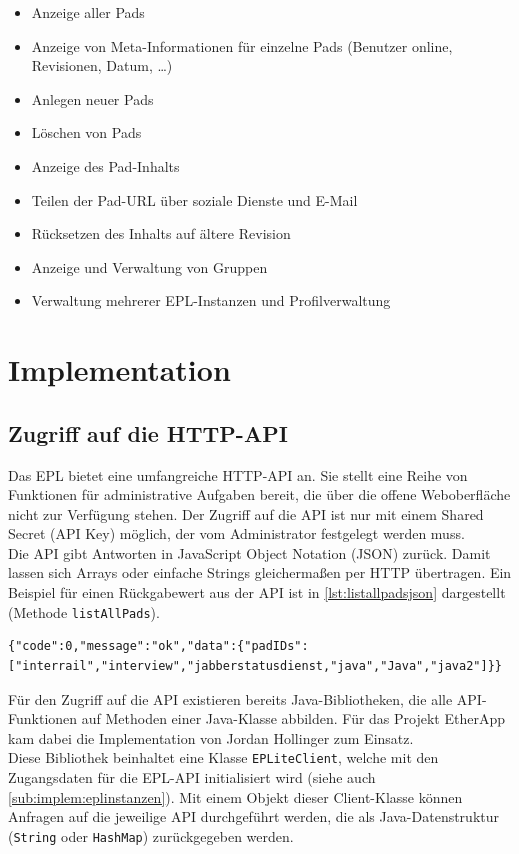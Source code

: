 \begin{itemize}
	\item Anzeige aller Pads
	\item Anzeige von Meta-Informationen für einzelne Pads (Benutzer online, Revisionen, Datum, …)
	\item Anlegen neuer Pads
	\item Löschen von Pads
	\item Anzeige des Pad-Inhalts
	\item Teilen der Pad-URL über soziale Dienste und E-Mail
	\item Rücksetzen des Inhalts auf ältere Revision
	\item Anzeige und Verwaltung von Gruppen
	\item Verwaltung mehrerer EPL-Instanzen und Profilverwaltung
\end{itemize}



\section{Implementation}
\label{sec:implem}
\subsection{Zugriff auf die HTTP-API}
Das EPL bietet eine umfangreiche HTTP-API an.
Sie stellt eine Reihe von Funktionen für administrative Aufgaben bereit, die über die offene Weboberfläche nicht zur Verfügung stehen.
Der Zugriff auf die API ist nur mit einem Shared Secret (API Key) möglich, der vom Administrator festgelegt werden muss.\\
Die API gibt Antworten in JavaScript Object Notation (JSON) zurück.
Damit lassen sich Arrays oder einfache Strings gleichermaßen per HTTP übertragen.
Ein Beispiel für einen Rückgabewert aus der API ist in \autoref{lst:listallpadsjson} dargestellt (Methode \texttt{listAllPads}).
\begin{lstlisting}[caption=Rückgabewert der API zur Methode listAllPads,label=lst:listallpadsjson]
{"code":0,"message":"ok","data":{"padIDs":["interrail","interview","jabberstatusdienst,"java","Java","java2"]}}
\end{lstlisting}

Für den Zugriff auf die API existieren bereits Java-Bibliotheken, die alle API-Funktionen auf Methoden einer Java-Klasse abbilden.
Für das Projekt EtherApp kam dabei die Implementation von Jordan Hollinger zum Einsatz.\\
Diese Bibliothek beinhaltet eine Klasse \texttt{EPLiteClient}, welche mit den Zugangsdaten für die EPL-API initialisiert wird (siehe auch \autoref{sub:implem:eplinstanzen}).
Mit einem Objekt dieser Client-Klasse können Anfragen auf die jeweilige API durchgeführt werden, die als Java-Datenstruktur (\texttt{String} oder \texttt{HashMap}) zurückgegeben werden.



